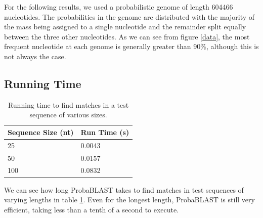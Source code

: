 \documentclass[11pt]{IEEEtran}
\begin{document}
For the following results, we used a probabilistic genome of length 604466 nucleotides. The probabilities in the genome are distributed with the majority of the mass being assigned to a single nucleotide and the remainder split equally between the three other nucleotides. As we can see from figure \ref{data}, the most frequent nucleotide at each genome is generally greater than 90\%, although this is not always the case.

\subsection{Running Time}

\begin{table}
\centering
\caption{Running time to find matches in a test sequence of various sizes.}
\label{rt}
\begin{tabular}{|l|l|}
\hline
Sequence Size (nt) & Run Time (s) \\ \hline
25 & 0.0043 \\ \hline
50 & 0.0157\\ \hline
100 & 0.0832 \\ 
\hline
\end{tabular}
\end{table}

We can see how long ProbaBLAST takes to find matches in test sequences of varying lengths in table \ref{rt}. Even for the longest length, ProbaBLAST is still very efficient, taking less than a tenth of a second to execute.
\end{document}
